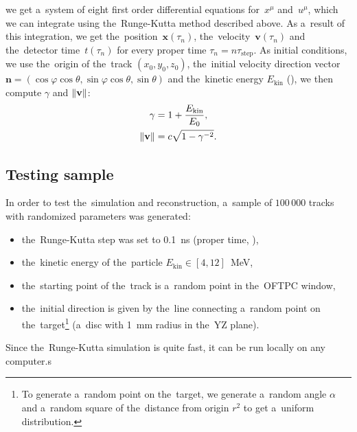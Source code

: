 		we get a~system of eight first order differential equations for~$x^\mu$ and~$u^\mu$, which we can integrate using the~Runge-Kutta method described above. As a~result of this integration, we get the~position~$\mathbf{x}(\tau_n)$, the~velocity~$\mathbf{v}(\tau_n)$ and the~detector time~$t(\tau_n)$ for every proper time $\tau_n = n \tau_\text{step}$.  As initial conditions, we use the~origin of the~track $(x_0,y_0,z_0)$, the~initial velocity direction vector $\mathbf{n} = (\cos\varphi\cos\theta,\sin\varphi\cos\theta,\sin\theta)$ and the~kinetic energy $E_\text{kin}$  (), we then compute $\gamma$ and $\norm{\mathbf{v}}$:
			\begin{align}
				\gamma &= 1 + \frac{E_\text{kin}}{E_0},\\
				\norm{\mathbf{v}} &= c\sqrt{1-\gamma^{-2}}.
			\end{align}
			
		\subsection{Testing sample}
		\label{sec:rktest}
		
		In order to test the~simulation and reconstruction, a~sample of $100\,000$ tracks with randomized parameters was generated:
			\begin{itemize}[topsep=4pt,itemsep=2pt]
				\item the~Runge-Kutta step was set to 0.1~ns (proper time, ),
				\item the~kinetic energy of the~particle $E_\text{kin} \in [4,12]$~MeV,
				\item the~starting point of the~track is a~random point in the~\ac{OFTPC} window,
				\item the~initial direction is given by the~line connecting a~random point on the~target\footnote{To generate a~random point on the~target, we generate a~random angle $\alpha$ and a~random square of the~distance from origin $r^2$ to get a~uniform distribution.} (a~disc with 1~mm radius in the~YZ plane).
			\end{itemize}
		Since the~Runge-Kutta simulation is quite fast, it can be run locally on any computer.s 